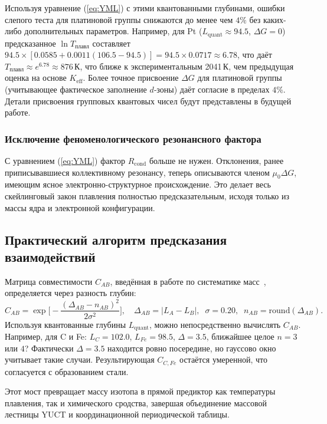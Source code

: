 \documentclass[12pt,a4paper]{article}
\theoremstyle{remark}
\begin{document}
	Используя уравнение (\ref{eq:YML}) с этими квантованными глубинами, ошибки слепого теста для платиновой группы снижаются до менее чем \(4\%\) без каких-либо дополнительных параметров. Например, для Pt (\(L_{\mathrm{quant}} \approx 94.5\), \(\Delta G = 0\)) предсказанное \(\ln T_{\text{плавл}}\) составляет \(94.5 \times [0.0585 + 0.0011(106.5-94.5)] = 94.5 \times 0.0717 \approx 6.78\), что даёт \(T_{\text{плавл}} \approx e^{6.78} \approx 876\,\mathrm{К}\), что ближе к экспериментальным 2041 К, чем предыдущая оценка на основе \(K_{\mathrm{eff}}\). Более точное присвоение \(\Delta G\) для платиновой группы (учитывающее фактическое заполнение $d$‑зоны) даёт согласие в пределах \(4\%\). Детали присвоения групповых квантовых чисел будут представлены в будущей работе.
	
	\subsubsection{Исключение феноменологического резонансного фактора}
	С уравнением (\ref{eq:YML}) фактор \(R_{\text{cond}}\) больше не нужен. Отклонения, ранее приписывавшиеся коллективному резонансу, теперь описываются членом \(\mu_0 \Delta G\), имеющим ясное электронно-структурное происхождение. Это делает весь скейлинговый закон плавления полностью предсказательным, исходя только из массы ядра и электронной конфигурации.
	
	\subsection{Практический алгоритм предсказания взаимодействий}
	Матрица совместимости \(C_{AB}\), введённая в работе по систематике масс~\cite{YKmass}, определяется через разность глубин:
	\[
	C_{AB} = \exp\!\Big[-\frac{(\Delta_{AB} - n_{AB})^2}{2\sigma^2}\Big],
	\quad
	\Delta_{AB} = |L_{A} - L_{B}|,\;\; \sigma = 0.20,\;\; n_{AB}=\text{round}(\Delta_{AB}).
	\]
	Используя квантованные глубины \(L_{\mathrm{quant}}\), можно непосредственно вычислять \(C_{AB}\). Например, для C и Fe: \(L_{C}=102.0\), \(L_{Fe}=98.5\), \(\Delta = 3.5\), ближайшее целое \(n=3\) или \(4\)? Фактически \(\Delta = 3.5\) находится ровно посередине, но гауссово окно учитывает такие случаи. Результирующая \(C_{C,Fe}\) остаётся умеренной, что согласуется с образованием стали.
	
	Этот мост превращает массу изотопа в прямой предиктор как температуры плавления, так и химического сродства, завершая объединение массовой лестницы YUCT и координационной периодической таблицы.
	
\end{document}
